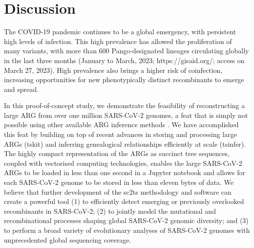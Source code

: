 \documentclass{article}
\begin{document}



\section{Discussion}
The COVID-19 pandemic continues to be a global emergency,
with persistent high levels of infection. This high prevalence has allowed the
proliferation of many variants, with more than 600 Pango-designated lineages
circulating globally in the last three months (January to March, 2023;
https://gisaid.org/; access on March 27, 2023). High prevalence also brings a
higher risk of coinfection, increasing opportunities for new phenotypically
distinct recombinants to emerge and spread.

In this proof-of-concept study, we demonstrate the feasibility of
reconstructing a large ARG from over one million SARS-CoV-2 genomes, a feat
that is simply not possible using other available ARG inference methods
\citep{Rasmussen2014-el,Ignatieva2021-rg, Speidel2019-yh}. We have accomplished
this feat by building on top of recent advances in storing and processing large
ARGs (tskit) and inferring genealogical relationships efficiently at scale
(tsinfer). The highly compact representation of the ARGs as succinct tree
sequences, coupled with vectorised computing technologies, enables the large
SARS-CoV-2 ARGs to be loaded in less than one second in a Jupyter notebook and
allows for each SARS-CoV-2 genome to be stored in less than eleven bytes of
data. We believe that further development of the sc2ts methodology and software
can create a powerful tool (1) to efficiently detect emerging or previously
overlooked recombinants in SARS-CoV-2; (2) to jointly model the mutational and
recombinational processes shaping global SARS-CoV-2 genomic diversity; and (3)
to perform a broad variety of evolutionary analyses of SARS-CoV-2 genomes with
unprecedented global sequencing coverage.
\end{document}
